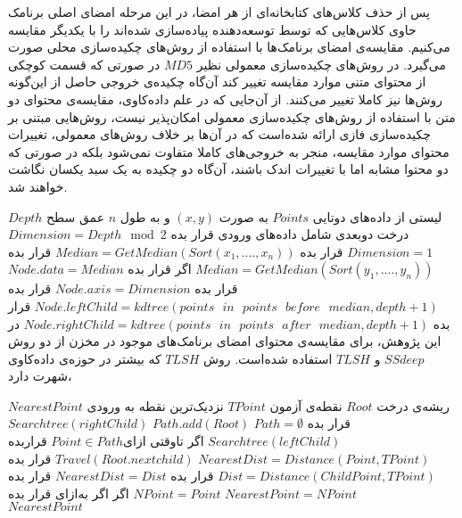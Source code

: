 پس از حذف کلاس‌های کتابخانه‌ای از هر امضا، در این مرحله امضای اصلی برنامک حاوی کلاس‌هایی که توسط توسعه‌دهنده پیاده‌سازی شده‌اند را با یکدیگر مقایسه می‌کنیم. مقایسه‌ی امضای برنامک‌ها با استفاده از روش‌های چکیده‌سازی محلی صورت می‌گیرد. در روش‌های چکیده‌سازی معمولی نظیر $MD5$ در صورتی که قسمت کوچکی از محتوای متنی موارد مقایسه تغییر کند آن‌گاه چکیده‌ی خروجی حاصل از این‌گونه روش‌ها نیز کاملا تغییر می‌کنند. از آن‌جایی که در علم داده‌کاوی، مقایسه‌ی محتوای دو متن با استفاده از روش‌های چکیده‌سازی معمولی امکان‌پذیر نیست، روش‌هایی مبتنی بر چکیده‌سازی فازی ارائه شده‌است که در آن‌ها بر خلاف روش‌های معمولی، تغییرات محتوای موارد مقایسه، منجر به خروجی‌های کاملا متفاوت نمی‌شود بلکه در صورتی که دو محتوا مشابه اما با تغییرات اندک باشند، آن‌گاه دو چکیده به یک سبد یکسان نگاشت خواهند شد. 

 لیستی از داده‌های دوتایی $Points$ به صورت $(x,y)$ و به طول $n$ 
 عمق سطح $Depth$
 درخت دو‌بعدی شامل داده‌های ورودی
 قرار بده 
$Dimension=Depth \mod 2$
 $Dimension=1$
 قرار بده $Median=GetMedian(Sort(x_{1},....,x_{n}))$
 قرار‌ بده
$Median=GetMedian(Sort(y_{1},....,y_{n}))$
‌اگر
 قرار بده $Node.data=Median$
 قرار بده $Node.axis=Dimension$
 قرار بده
 $Node.leftChild = kdtree(points \:\:\: in \:\:\: points \:\:\: before \:\:\: median, depth+1)$
  قرار بده
 $Node.rightChild = kdtree(points \:\:\: in \:\:\: points \:\:\: after \:\:\: median, depth+1)$
در این پژوهش، برای مقایسه‌ی محتوای امضای برنامک‌های موجود در مخزن از دو روش $SSdeep$ و $TLSH$ استفاده شده‌است. روش $TLSH$ که بیشتر در حوزه‌ی داده‌کاوی شهرت دارد، 


 ریشه‌ی درخت $Root$ 
 نقطه‌ی آزمون $TPoint$
 نزدیک‌ترین نقطه به ورودی $NearestPoint$
 قرار‌ بده $Path=\emptyset$
 $Path.add(Root)$
 $Searchtree(rightChild)$
 $Searchtree(leftChild)$
‌اگر
‌تاوقتی
‌ازای{$Point \in Path$}
 قرار‌بده 
$NearestDist=Distance(Point,TPoint)$
 $Travel(Root.nextchild)$
 قرار بده 
$Dist=Distance(ChildPoint,TPoint)$
 قرار بده $NearestDist=Dist$
 قرار بده $NPoint=Point$
‌اگر
‌اگر
‌به‌ازای
 قرار بده $NearestPoint=NPoint$\\
  $NearestPoint$













